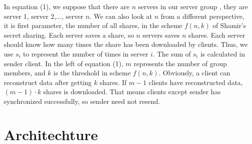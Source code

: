 \documentclass[twocolumn,10pt]{article}
\begin{document}
In equation (1), we suppose that there are $n$ servers in our server group , they are server 1, server 2,..., server $n$. We can also look at $n$ from a different perspective, it is first parameter, the number of all shares, in the scheme $f(n, k)$ of Shamir's secret sharing. Each server saves a share, so $n$ servers saves $n$ shares. Each server should know how many times the share has been downloaded by clients. Thus, we use $s_i$ to represent the number of times in server $i$. The sum of $s_i$ is calculated in sender client. In the left of equation (1), $m$ represents the number of group members, and $k$ is the threshold in scheme $f(n, k)$. Obviously, a client can reconstruct data after getting $k$ shares. If $m-1$ clients have reconstructed data, $(m-1)\cdot k$ shares is downloaded. That means clients except sender has synchronized successfully, so sender need not resend.

\section{Architechture}

{\tiny
\printbibliography
}
\end{document}
